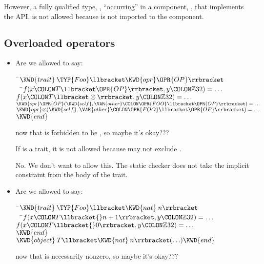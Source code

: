However, a fully qualified type, ,
``occurring'' in a component, , that implements the API, 
is not allowed because  is not imported to the component.

\subsection{Overloaded operators}

\begin{itemize}
\item Are we allowed to say:
\begin{Fortress}
{\tt~}\pushtabs\=\+\( \KWD{trait}\:\TYP{Foo}\llbracket\KWD{opr} \mathord{\OPR{OP}}\rrbracket\)\\
{\tt~~}\pushtabs\=\+\(   f(x\COLON T\llbracket\OPR{OP}\rrbracket, y\COLON \mathbb{Z}32) = \ldots\)\\
\(   f(x\COLON T\llbracket\otimes\rrbracket, y\COLON \mathbb{Z}32) = \ldots\)\\
\(   \KWD{opr} \mathord{\OPR{OP}}(\KWD{self}, \VAR{other}\COLON \OPR{FOO}\llbracket\OPR{OP}\rrbracket) = \ldots\)\\
\(   \KWD{opr} \mathord{\otimes}(\KWD{self}, \VAR{other}\COLON \OPR{FOO}\llbracket\OPR{OP}\rrbracket) = \ldots\)\-\\\poptabs
\( \KWD{end}\)\-\\\poptabs
\end{Fortress}
now that  is forbidden to be \EXP{\otimes},
so maybe it's okay???

If  is a trait, it is not allowed because 
may not exclude .

No. We don't want to allow this. The static checker does not take the implicit constraint from the body of the trait.

\item Are we allowed to say:
\begin{Fortress}
{\tt~}\pushtabs\=\+\( \KWD{trait}\:\TYP{Foo}\llbracket\KWD{nat}\:n\rrbracket\)\\
{\tt~~}\pushtabs\=\+\(   f(x\COLON T\llbracket{}n+1\rrbracket, y\COLON \mathbb{Z}32) = \ldots\)\\
\(   f(x\COLON T\llbracket{}0\rrbracket, y\COLON \mathbb{Z}32) = \ldots\)\-\\\poptabs
\( \KWD{end}\)\\
\( \KWD{object}\:T\llbracket\KWD{nat}\:n\rrbracket( \ldots ) \KWD{end}\)\-\\\poptabs
\end{Fortress}
now that  is necessarily nonzero, so maybe it's okay???


\end{itemize}
